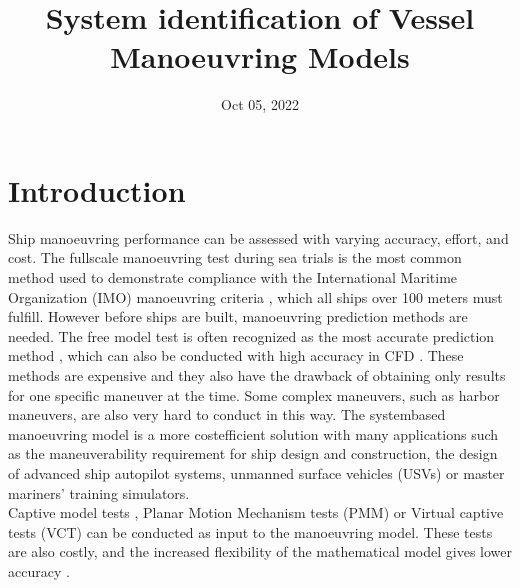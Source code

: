 \documentclass[review]{elsarticle}
\title{System identification of Vessel Manoeuvring Models}
\date{Oct 05, 2022}
\begin{document}



\pagestyle{empty}

\pagestyle{plain}

\pagestyle{normal}
\label{\detokenize{index::doc}}



\section{Introduction}
\label{\detokenize{00.02_introduction:introduction}}\label{\detokenize{00.02_introduction::doc}}
\sphinxAtStartPar
Ship manoeuvring performance can be assessed with varying accuracy, effort, and cost. The full\sphinxhyphen{}scale manoeuvring test during sea trials is the most common method used to demonstrate compliance with the International Maritime Organization (IMO) manoeuvring criteria \cite{imo_standards_2002}, which all ships over 100 meters must fulfill.
However before ships are built, manoeuvring prediction methods are needed. The free model test \cite{ittc_ittc_2008} is often recognized as the most accurate prediction method \cite{ittc_maneuvering_2008}, which can also be conducted with high accuracy in CFD \cite{araki_estimating_2012}. These methods are expensive and they also have the drawback of obtaining only results for one specific maneuver at the time. Some complex maneuvers, such as harbor maneuvers, are also very hard to conduct in this way.
The system\sphinxhyphen{}based manoeuvring model is a more cost\sphinxhyphen{}efficient solution with many applications such as the maneuverability requirement for ship design and construction, the design of advanced ship autopilot systems, unmanned surface vehicles (USVs) \cite{bai_review_2022} or master mariners’ training simulators.\\
Captive model tests \cite{ittc_ittc_2008-1}, Planar Motion Mechanism tests (PMM) \cite{ittc_ittc_2008-1} or Virtual captive tests (VCT) \cite{liu_predictions_2018} can be conducted as input to the manoeuvring model. These tests are also costly, and the increased flexibility of the mathematical model gives lower accuracy \cite{ittc_maneuvering_2008}.
\end{document}
